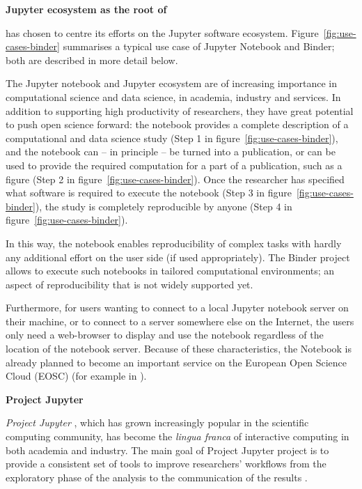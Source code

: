 \noindent\textbf{Jupyter ecosystem as the root of \TheProject}


\TheProject has chosen to centre its efforts on the Jupyter software
ecosystem. Figure~\ref{fig:use-cases-binder} summarises a typical use
case of Jupyter Notebook and Binder; both are described in more detail
below.

The Jupyter notebook and Jupyter ecosystem are of increasing
importance in computational science and data science, in academia,
industry and services. In addition to supporting high productivity of
researchers, they have great potential to push open science forward:
the notebook provides a complete description of a computational and
data science study (Step 1 in figure~\ref{fig:use-cases-binder}), and the notebook can -- in principle -- be turned
into a publication, or can be used to provide the required computation
for a part of a publication, such as a figure
(Step 2 in figure~\ref{fig:use-cases-binder}). Once the researcher has
specified what software is required to execute the notebook (Step 3
in figure~\ref{fig:use-cases-binder}), the study is completely
reproducible by anyone (Step 4 in figure~\ref{fig:use-cases-binder}).

In this way, the notebook enables reproducibility of complex tasks
with hardly any additional effort on the user side (if used
appropriately). The Binder project allows to execute such notebooks in
tailored computational environments; an aspect of reproducibility that
is not widely supported yet.

Furthermore, for users wanting to connect
to a local Jupyter notebook server on their machine, or to connect to
a server somewhere else on the Internet, the users only need a
web-browser to display and use the notebook regardless of the location
of the notebook server. Because of these
characteristics, the Notebook is already planned to become an
important service on the European Open Science Cloud (EOSC) (for
example in \cite{panosc}).

\medskip\noindent\textbf{Project Jupyter}

\emph{Project Jupyter} \cite{Jupyter}, which has grown increasingly popular in the scientific
computing community, has become the \emph{lingua franca} of interactive
computing in both academia and industry. The main goal of Project Jupyter
project is to provide a consistent set of tools to improve researchers'
workflows from the exploratory phase of the analysis to the communication
of the results \cite{Kluyver2016}.

